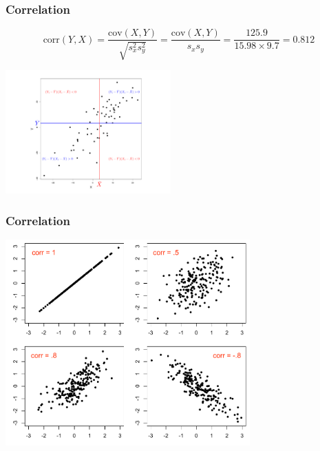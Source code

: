\documentclass{beamer}
\newcommand{\mr}[1]{\mathrm{#1}}
\begin{document}
\begin{frame}
\frametitle{Correlation} 

\vspace{-1mm}
$$
\text{corr}(Y,X) = \frac{\mr{cov}(X,Y)}{\sqrt{s^2_x s^2_y}} = \frac{\mr{cov}(X,Y)}{s_x s_y} =\frac{125.9}{15.98 \times 9.7} = 0.812
$$

\vspace{-2mm}
\hspace*{20mm}\includegraphics[width=2.5in]{figures/cor-pic.pdf}


\end{frame}

\begin{frame}
\frametitle{Correlation}

\centering \includegraphics[width=3.7in]{figures/corr}

\end{frame}
\end{document}
